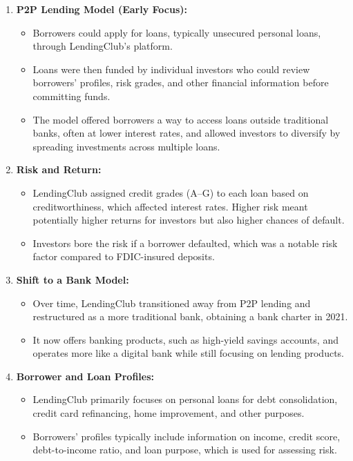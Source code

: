 \documentclass[
  letterpaper,
  DIV=11,
  numbers=noendperiod]{scrartcl}
\providecommand{\tightlist}{%
  \setlength{\itemsep}{0pt}\setlength{\parskip}{0pt}}
\begin{document}
\begin{enumerate}
\def\labelenumi{\arabic{enumi}.}
\tightlist
\item
  \textbf{P2P Lending Model (Early Focus):}

  \begin{itemize}
  \tightlist
  \item
    Borrowers could apply for loans, typically unsecured personal loans,
    through LendingClub's platform.
  \item
    Loans were then funded by individual investors who could review
    borrowers' profiles, risk grades, and other financial information
    before committing funds.
  \item
    The model offered borrowers a way to access loans outside
    traditional banks, often at lower interest rates, and allowed
    investors to diversify by spreading investments across multiple
    loans.
  \end{itemize}
\item
  \textbf{Risk and Return:}

  \begin{itemize}
  \tightlist
  \item
    LendingClub assigned credit grades (A--G) to each loan based on
    creditworthiness, which affected interest rates. Higher risk meant
    potentially higher returns for investors but also higher chances of
    default.
  \item
    Investors bore the risk if a borrower defaulted, which was a notable
    risk factor compared to FDIC-insured deposits.
  \end{itemize}
\item
  \textbf{Shift to a Bank Model:}

  \begin{itemize}
  \tightlist
  \item
    Over time, LendingClub transitioned away from P2P lending and
    restructured as a more traditional bank, obtaining a bank charter in
    2021.
  \item
    It now offers banking products, such as high-yield savings accounts,
    and operates more like a digital bank while still focusing on
    lending products.
  \end{itemize}
\item
  \textbf{Borrower and Loan Profiles:}

  \begin{itemize}
  \tightlist
  \item
    LendingClub primarily focuses on personal loans for debt
    consolidation, credit card refinancing, home improvement, and other
    purposes.
  \item
    Borrowers' profiles typically include information on income, credit
    score, debt-to-income ratio, and loan purpose, which is used for
    assessing risk.
  \end{itemize}
\end{enumerate}
\end{document}
